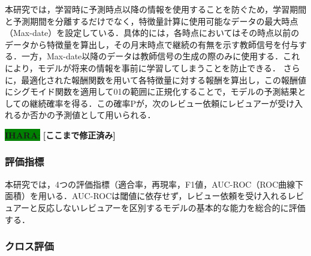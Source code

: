 \documentclass[submit,techrep,noauthor]{ipsj}
\newcommand{\ihara}[1]{\colorbox{green}{{\bf IHARA}:}{\color{blue} {\textbf{[#1]}}}}
\begin{document}
本研究では，学習時に予測時点以降の情報を使用することを防ぐため，学習期間と予測期間を分離するだけでなく，特徴量計算に使用可能なデータの最大時点（Max-date）を設定している．具体的には，各時点においてはその時点以前のデータから特徴量を算出し，その月末時点で継続の有無を示す教師信号を付与する．一方，Max-date以降のデータは教師信号の生成の際のみに使用する．これにより，モデルが将来の情報を事前に学習してしまうことを防止できる．
さらに，最適化された報酬関数を用いて各特徴量に対する報酬を算出し，この報酬値にシグモイド関数を適用して01の範囲に正規化することで，モデルの予測結果としての継続確率を得る．この確率Pが，次のレビュー依頼にレビュアーが受け入れるか否かの予測値として用いられる．



\ihara{ここまで修正済み}

\subsubsection{評価指標}

本研究では，4つの評価指標（適合率，再現率，F1値，AUC-ROC（ROC曲線下面積）を用いる．AUC-ROCは閾値に依存せず，レビュー依頼を受け入れるレビュアーと反応しないレビュアーを区別するモデルの基本的な能力を総合的に評価する．

\subsubsection{クロス評価}
\end{document}
